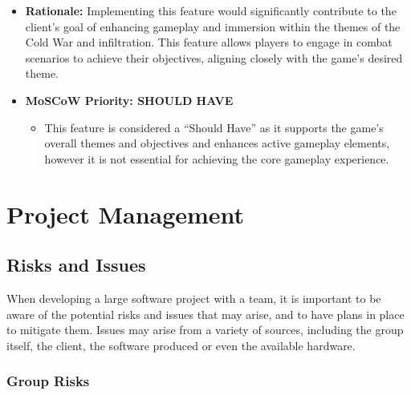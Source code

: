\documentclass[11pt, a4paper]{article}
\begin{document}
\begin{itemize}
          \begin{itemize}
              \item Given the player is engaged in combat with an enemy
              \item When the player takes damage
              \item Then the player’s health points decrease according to how much damage they took
              \item And the player’s screen shows visual feedback
          \end{itemize}

    \item \textbf{Rationale:} Implementing this feature would significantly contribute to the client’s goal of enhancing gameplay and immersion within the themes of the Cold War and infiltration. This feature allows players to engage in combat scenarios to achieve their objectives, aligning closely with the game’s desired theme.

    \item \textbf{MoSCoW Priority: SHOULD HAVE}

          \begin{itemize}
              \item This feature is considered a “Should Have” as it supports the game’s overall themes and objectives and enhances active gameplay elements, however it is not essential for achieving the core gameplay experience.
          \end{itemize}
\end{itemize}

\newpage

\section{Project Management}

\subsection{Risks and Issues}

\noindent When developing a large software project with a team, it is important to be aware of the potential risks and issues that may arise, and to have plans in place to mitigate them. Issues may arise from a variety of sources, including the group itself, the client, the software produced or even the available hardware.

\subsubsection{Group Risks}
\end{document}
